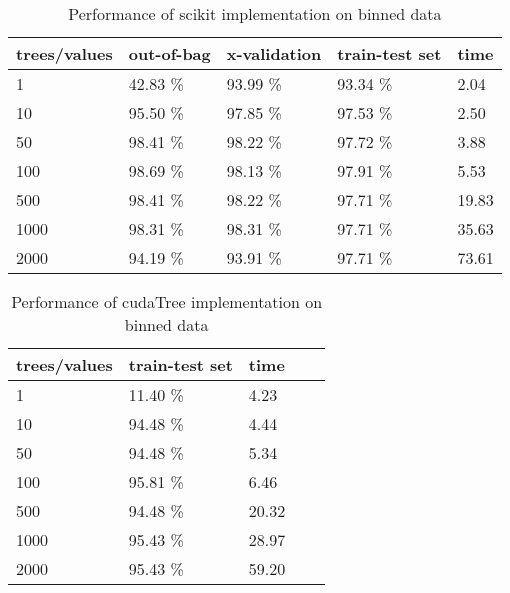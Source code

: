\documentclass[thesis=B,english]{FITthesis}[2012/10/20]
\begin{document}
\begin{table}[h]
\begin{tabular}{|l|l|l|l|l|}
\hline
trees/values & out-of-bag & x-validation & train-test set & time \\ \hline
1            &42.83 \%           &93.99 \%              &93.34 \%                & 2.04          \\ \hline
10           &95.50 \%           &97.85 \%              &97.53 \%                &2.50           \\ \hline
50           &98.41 \%           &98.22 \%              &97.72 \%                &3.88        \\ \hline
100          &98.69 \%           &98.13 \%              &97.91 \%                &5.53        \\ \hline
500          &98.41 \%           &98.22 \%              &97.71 \%                &19.83      \\ \hline
1000         &98.31 \%           &98.31 \%              &97.71 \%                &35.63         \\ \hline
2000         &94.19 \%           &93.91 \%              &97.71 \%                &73.61        \\ \hline
\end{tabular}
\caption{Performance of scikit implementation on binned data}
\label{tab:scikit-binned}
\end{table}
\begin{table}[h]
\begin{tabular}{|l|l|l|l|l|}
\hline
trees/values & train-test set & time \\ \hline
1            & 11.40 \%              & 4.23      \\ \hline
10           & 94.48 \%              & 4.44      \\ \hline
50           & 94.48 \%              & 5.34      \\ \hline
100          & 95.81 \%              & 6.46      \\ \hline
500          & 94.48 \%              & 20.32     \\ \hline
1000         & 95.43 \%              & 28.97     \\ \hline
2000         & 95.43 \%              & 59.20     \\ \hline
\end{tabular}
\caption{Performance of cudaTree implementation on binned data}
\label{tab:scikit-binned}
\end{table}
\end{document}
